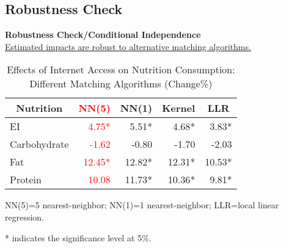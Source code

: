 \documentclass{beamer}	%
\theoremstyle{plain}
\theoremstyle{definition}
\theoremstyle{remark}
\numberwithin{equation}{section}
\begin{document}
\subsection {Robustness Check}
\begin{frame}
	\textbf{Robustness Check/Conditional Independence} \\
	\underline{Estimated impacts are robust to alternative matching algorithms.} \\
	\centering
	\begin{table}[]
		\caption{Effects of Internet Access on Nutrition Consumption: Different Matching Algorithms (Change\%)}
		\begin{tabular}{lrrrr}
			\hline
			\multicolumn{1}{c}{Nutrition} & \multicolumn{1}{c}{\textcolor{red}{NN(5)}} & \multicolumn{1}{c}{NN(1)} & \multicolumn{1}{c}{Kernel} & \multicolumn{1}{c}{LLR} \\
			\hline
			EI              & \textcolor{red}{4.75*}                               & 5.51*                               & 4.68*                                                              & 3.83*                                \\
			Carbohydrate         & \textcolor{red}{-1.62}                                 & -0.80                               & -1.70                                                            & -2.03                                \\
			Fat                  & \textcolor{red}{12.45*}                               & 12.82*                              & 12.31*                                                            & 10.53*                                \\
			Protein              & \textcolor{red}{10.08}                                & 11.73*                               & 10.36*                                                           & 9.81*                                \\
			\hline
		\end{tabular}%
		\begin{tablenotes}
			\item \tiny{NN(5)=5 nearest-neighbor; NN(1)=1 nearest-neighbor; LLR=local linear regression.}
			\item \tiny{* indicates the significance level at 5\%.}
		\end{tablenotes}		
	\end{table}
\end{frame}
\end{document}
